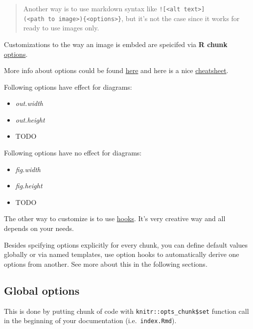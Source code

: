 \documentclass[
  12pt,
  a4paper,
  12pt,
  oneside,
  openany]{book}
\providecommand{\tightlist}{%
  \setlength{\itemsep}{0pt}\setlength{\parskip}{0pt}}
\begin{document}
\begin{quote}
Another way is to use markdown syntax like \texttt{!{[}\textless{}alt\ text\textgreater{}{]}(\textless{}path\ to\ image\textgreater{})\{\textless{}options\textgreater{}\}}, but it's not the case since it works for ready to use images only.
\end{quote}

Customizations to the way an image is embded are speicifed via \textbf{R chunk} \href{https://bookdown.org/yihui/rmarkdown/r-code.html\#figures}{options}.

More info about options could be found \href{https://yihui.org/knitr/options/}{here} and here is a nice \href{https://www.rstudio.com/wp-content/uploads/2015/03/rmarkdown-reference.pdf}{cheatsheet}.

Following options have effect for diagrams:

\begin{itemize}
\tightlist
\item
  \emph{out.width}
\item
  \emph{out.height}
\item
  TODO
\end{itemize}

Following options have no effect for diagrams:

\begin{itemize}
\tightlist
\item
  \emph{fig.width}
\item
  \emph{fig.height}
\item
  TODO
\end{itemize}

The other way to customize is to use \href{https://yihui.org/knitr/hooks/}{hooks}. It's very creative way and all depends on your needs.

Besides spcifying options explicitly for every chunk, you can define default values globally or via named templates, use option hooks to automatically derive one options from another. See more about this in the following sections.

\hypertarget{usage-customize-globalOpts}{%
\subsection{Global options}\label{usage-customize-globalOpts}}

This is done by putting chunk of code with \texttt{knitr::opts\_chunk\$set} function call in the beginning of your documentation (i.e.~\texttt{index.Rmd}).
\end{document}
